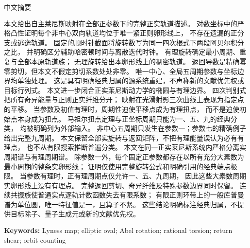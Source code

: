 \documentclass[10pt]{article}
\begin{document}
\begin{abstract}
uses a complete Abel rotation formula and two explicitly credited classical
endpoint limits, not global monotonicity or a numerical orbit fit. When
the parameter is rational, the classical elliptic-torsion classification
restricts positive rational periodic points to periods one, five and nine;
the large-prime real ovals therefore contain no rational point. Exact
return shears and all singular and exceptional boundaries remain part of
the same orbit description. Continuous resonant families obstruct the
ordinary real point-cardinality zeta. On every finite regular annulus the
generic Koopman spectrum is the unit circle, its only eigenvalue is one,
and the operator is noncompact; the exceptional parameter instead has five
pure-point roots. The result is an explicitly owner-heavy source-local
reconstruction, with no target divisor or quantum-generator claim.
\fi
\end{abstract}
\begin{center}{\cjkfont 中文摘要}\end{center}
{\cjkfont\small\raggedright
\ifcase\CRevisionRound
本文给出自主莱尼斯映射在全部正参数下的完整正实轨道描述。
对数坐标中的严格凸性证明每个非中心双向轨道均位于唯一紧正则卵形线上，
不存在遗漏的正分支或逃逸轨道。
固定的顺时针截面将旋转数写为同一四次根式下两段阿贝尔积分之比，
并明确区分辅助哈密顿时间与离散迭代时钟。
有理旋转确定最小周期、重复与全部本原轨道族；
无理旋转给出本卵形线上的稠密轨道。
返回导数是精确幂零剪切，但本文不假定剪切系数处处非零。
唯一中心、全局五周期参数与坐标边界均单独处理。
这是具有明确经典归属的源系统重建，不声称新的文献优先权或目标行列式。
\or
本文进一步闭合正实莱尼斯动力学的椭圆与有理边界。
四次判别式把所有奇异能量与正则正实纤维分开；
映射在光滑射影三次曲线上表现为指定点的平移。
当参数及初值有理时，周期性迫使平移点成为有理扭点，
而不是迫使初始点本身成为扭点。
马祖尔扭点定理与正坐标周期只能为一、五、九的经典分类，
均被明确列为外部输入。
非中心五周期只发生在参数一；参数七的精确例子给出完整九周期。
本文保留全部实旋转与返回矩阵，不把有理能量误认为必有有理点，
也不从有限搜索推断普遍分类。
\else
本文在同一正实莱尼斯系统内严格分离实周期谱与有理周期谱。
除参数一外，每个固定正参数都存在以所有充分大素数为最小周期的整条实卵形线；
证明仅使用完整旋转公式和明确引用的经典端点极限。
当参数有理时，正有理周期点仅允许一、五、九周期，
因此这些大素数周期实卵形线上没有有理点。
完整返回剪切、奇异纤维及特殊参数边界同时保留。
连续共振族使普通实点逐轨计数函数失去有限系数；
有限正则环带上的一般库普曼谱为单位圆，唯一特征值是一，且算子不紧。
这些结论明确标注经典归属，不提供目标除子、量子生成元或新的文献优先权。
\fi\par}
\medskip
\noindent\textbf{Keywords:} Lyness map; elliptic oval; Abel rotation; rational torsion; return shear; orbit counting
\par{}\par
\end{document}
